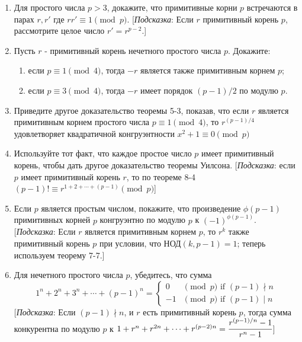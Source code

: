 \documentclass[11pt]{article}
\begin{document}
\begin{enumerate}
\begin{enumerate}
    \end{enumerate}
    \item Для простого числа $p > 3$, докажите, что примитивные корни $p$ встречаются в парах $r,r'$ где $rr' \equiv 1 \pmod{p}$. [\emph{Подсказка}: Если $r$ примитивный корень $p$, рассмотрите целое число $r'=r^{p-2}$.]
    \item Пусть $r$ - примитивный корень нечетного простого числа $p$. Докажите:
    \begin{enumerate}
        \item если $p \equiv 1 \pmod{4}$, тогда $-r$ является также примитивным корнем $p$;
        \item если $p \equiv 3 \pmod{4}$, тогда $-r$ имеет порядок $(p-1)/2$ по модулю $p$.
    \end{enumerate}
    \item Приведите другое доказательство теоремы 5-3, показав, что если $r$ является примитивным корнем простого числа $p \equiv 1 \pmod{4}$, то $r^{(p-1) / 4}$ удовлетворяет квадратичной конгруэнтности $x^2 + 1 \equiv 0 \pmod{p}$
    \item Используйте тот факт, что каждое простое число $p$ имеет примитивный корень, чтобы дать другое доказательство теоремы Уилсона. [\emph{Подсказка}: если $p$ имеет примитивный корень $r$, то по теореме 8-4 $(p-1)! \equiv r^{1 + 2 + \cdots + (p-1)} \pmod{p}$]
    \item Если $p$ является простым числом, покажите, что произведение $\phi(p - 1)$ примитивных корней $p$ конгруэнтно по модулю $p$ к $(-1)^{\phi(p - 1)}$. [\emph{Подсказка}: Если $r$ является примитивным корнем $p$, то $r^k$ также примитивный корень $p$ при условии, что $\text{НОД}(k,p - 1) = 1$; теперь используем теорему 7-7.]
    \item Для нечетного простого числа $p$, убедитесь, что сумма
    \begin{equation*}
    1^n + 2^n + 3^n + \cdots + (p - 1)^n = 
        \begin{cases}
            0 &\text{$\pmod{p}$ if $(p - 1) \nmid n$}\\
            -1 &\text{$\pmod{p}$ if $(p - 1) \mid n$}
        \end{cases}
    \end{equation*}
    $\Bigg[$\emph{Подсказка}: Если $(p - 1) \nmid n$, и $r$ есть примитивный корень $p$, тогда сумма конкурентна по модулю $p$ к $1 + r^n + r^{2n} + \cdots + r^{(p-2)n} = \cfrac{r^{(p-1)/n}-1}{r^n-1}$$\Biggl]$
\end{enumerate}
\end{document}
